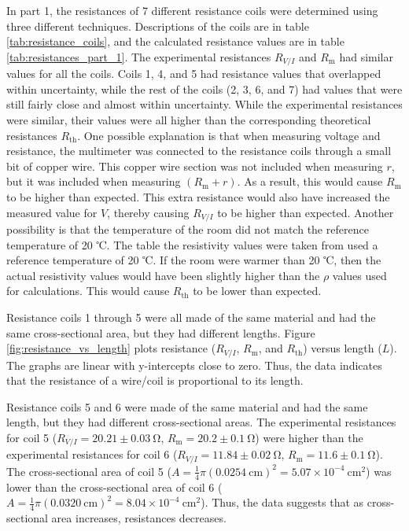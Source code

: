 \documentclass[12pt]{iopart} %
\gdef\sci#1#2{#1 \times 10^{#2}}
\gdef\units#1{~\mathrm{#1}}
\begin{document}
In part 1, the resistances of 7 different resistance coils were determined using three different techniques.
Descriptions of the coils are in table \ref{tab:resistance_coils}, and the calculated resistance values are in table \ref{tab:resistances_part_1}.
The experimental resistances $R_{V/I}$ and $R_\mathrm{m}$ had similar values for all the coils.
Coils 1, 4, and 5 had resistance values that overlapped within uncertainty, while the rest of the coils (2, 3, 6, and 7) had values that were still fairly close and almost within uncertainty.
While the experimental resistances were similar, their values were all higher than the corresponding theoretical resistances $R_\mathrm{th}$.
One possible explanation is that when measuring voltage and resistance, the multimeter was connected to the resistance coils through a small bit of copper wire.
This copper wire section was not included when measuring $r$, but it was included when measuring $(R_\mathrm{m} + r)$.
As a result, this would cause $R_\mathrm{m}$ to be higher than expected.
This extra resistance would also have increased the measured value for $V$, thereby causing $R_{V/I}$ to be higher than expected.
Another possibility is that the temperature of the room did not match the reference temperature of 20 ℃.
The table the resistivity values were taken from used a reference temperature of 20 ℃.
If the room were warmer than 20 ℃, then the actual resistivity values would have been slightly higher than the $\rho$ values used for calculations.
This would cause $R_\mathrm{th}$ to be lower than expected.

Resistance coils 1 through 5 were all made of the same material and had the same cross-sectional area, but they had different lengths.
Figure \ref{fig:resistance_vs_length} plots resistance ($R_{V/I}$, $R_\mathrm{m}$, and $R_\mathrm{th}$) versus length ($L$).
The graphs are linear with y-intercepts close to zero.
Thus, the data indicates that the resistance of a wire/coil is proportional to its length.

Resistance coils 5 and 6 were made of the same material and had the same length, but they had different cross-sectional areas.
The experimental resistances for coil 5 ($R_{V/I} = 20.21 \pm 0.03 \units{\Omega}$, $R_\mathrm{m} = 20.2 \pm 0.1 \units{\Omega}$) were higher than the experimental resistances for coil 6 ($R_{V/I} = 11.84 \pm 0.02 \units{\Omega}$, $R_\mathrm{m} = 11.6 \pm 0.1 \units{\Omega}$).
The cross-sectional area of coil 5 ($A = \frac{1}{4} \pi (0.0254 \units{cm})^2 = \sci{5.07}{-4} \units{cm^2}$) was lower than the cross-sectional area of coil 6 ($A = \frac{1}{4} \pi (0.0320 \units{cm})^2 = \sci{8.04}{-4} \units{cm^2}$).
Thus, the data suggests that as cross-sectional area increases, resistances decreases.
\end{document}

